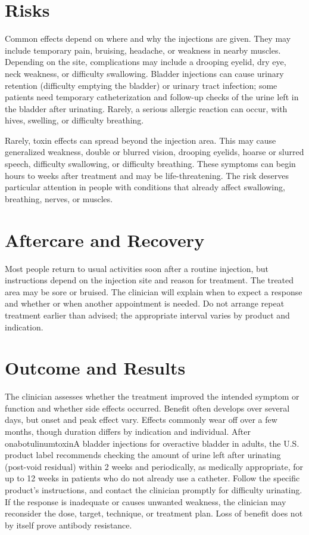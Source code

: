 \section*{Risks}
Common effects depend on where and why the injections are given. They may include temporary pain, bruising, headache, or weakness in nearby muscles. Depending on the site, complications may include a drooping eyelid, dry eye, neck weakness, or difficulty swallowing. Bladder injections can cause urinary retention (difficulty emptying the bladder) or urinary tract infection; some patients need temporary catheterization and follow-up checks of the urine left in the bladder after urinating. Rarely, a serious allergic reaction can occur, with hives, swelling, or difficulty breathing.

Rarely, toxin effects can spread beyond the injection area. This may cause generalized weakness, double or blurred vision, drooping eyelids, hoarse or slurred speech, difficulty swallowing, or difficulty breathing. These symptoms can begin hours to weeks after treatment and may be life-threatening. The risk deserves particular attention in people with conditions that already affect swallowing, breathing, nerves, or muscles.

\section*{Aftercare and Recovery}
Most people return to usual activities soon after a routine injection, but instructions depend on the injection site and reason for treatment. The treated area may be sore or bruised. The clinician will explain when to expect a response and whether or when another appointment is needed. Do not arrange repeat treatment earlier than advised; the appropriate interval varies by product and indication.

\section*{Outcome and Results}
The clinician assesses whether the treatment improved the intended symptom or function and whether side effects occurred. Benefit often develops over several days, but onset and peak effect vary. Effects commonly wear off over a few months, though duration differs by indication and individual. After onabotulinumtoxinA bladder injections for overactive bladder in adults, the U.S. product label recommends checking the amount of urine left after urinating (post-void residual) within 2 weeks and periodically, as medically appropriate, for up to 12 weeks in patients who do not already use a catheter. Follow the specific product's instructions, and contact the clinician promptly for difficulty urinating. If the response is inadequate or causes unwanted weakness, the clinician may reconsider the dose, target, technique, or treatment plan. Loss of benefit does not by itself prove antibody resistance.

